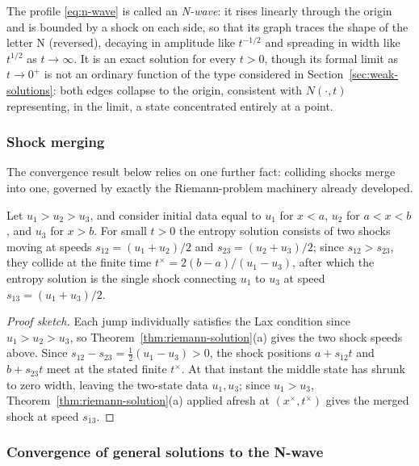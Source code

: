 The profile \eqref{eq:n-wave} is called an \emph{N-wave}: it rises
linearly through the origin and is bounded by a shock on each side, so
that its graph traces the shape of the letter N (reversed), decaying in
amplitude like $t^{-1/2}$ and spreading in width like $t^{1/2}$ as
$t\to\infty$. It is an exact solution for every $t>0$, though its formal
limit as $t\to0^+$ is not an ordinary function of the type considered in
Section~\ref{sec:weak-solutions}: both edges collapse to the origin,
consistent with $N(\cdot,t)$ representing, in the limit, a state
concentrated entirely at a point.

\subsubsection{Shock merging}
\label{subsubsec:shock-merging}

The convergence result below relies on one further fact: colliding
shocks merge into one, governed by exactly the Riemann-problem machinery
already developed.

\begin{lemma}
\label{lem:shock-merging}
Let $u_1>u_2>u_3$, and consider initial data equal to $u_1$ for $x<a$,
$u_2$ for $a<x<b$, and $u_3$ for $x>b$. For small $t>0$ the entropy
solution consists of two shocks moving at speeds $s_{12}=(u_1+u_2)/2$
and $s_{23}=(u_2+u_3)/2$; since $s_{12}>s_{23}$, they collide at the
finite time $t^\times = 2(b-a)/(u_1-u_3)$, after which the entropy
solution is the single shock connecting $u_1$ to $u_3$ at speed
$s_{13}=(u_1+u_3)/2$.
\end{lemma}

\begin{proof}[Proof sketch]
Each jump individually satisfies the Lax condition since
$u_1>u_2>u_3$, so Theorem~\ref{thm:riemann-solution}(a) gives the two
shock speeds above. Since $s_{12}-s_{23}=\tfrac12(u_1-u_3)>0$, the shock
positions $a+s_{12}t$ and $b+s_{23}t$ meet at the stated finite
$t^\times$. At that instant the middle state has shrunk to zero width,
leaving the two-state data $u_1,u_3$; since $u_1>u_3$,
Theorem~\ref{thm:riemann-solution}(a) applied afresh at $(x^\times,
t^\times)$ gives the merged shock at speed $s_{13}$.
\end{proof}

\subsubsection{Convergence of general solutions to the N-wave}
\label{subsubsec:n-wave-convergence}

